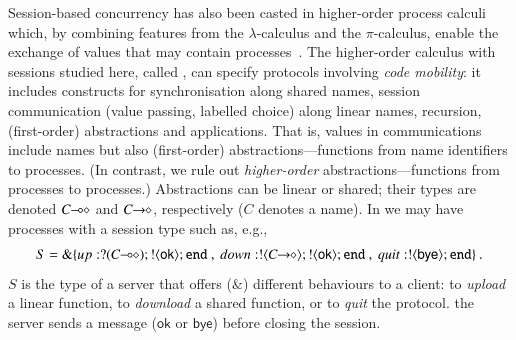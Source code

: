 \documentclass[runningheads]{llncs}
\begin{document}
Session-based concurrency has also been casted in {higher-order} process
calculi which, by combining features from the $\lambda$-calculus and the $\pi$-calculus, 
enable the exchange of values 
that may contain processes~\cite{tlca07,DBLP:journals/jfp/GayV10}. 
The higher-order calculus with sessions studied here, called \HOp,
can specify protocols involving \emph{code mobility}: it includes
constructs for 
synchronisation along shared names, 
session communication (value passing, labelled choice) along linear names,
recursion, 
 (first-order) abstractions 
 and applications.
 That is, 
 values in communications include names but also (first-order) abstractions---functions from name identifiers to processes. 
 (In contrast, we rule out \emph{higher-order} abstractions---functions from processes to processes.)
Abstractions can be linear or shared; their types are  denoted $C\!\! \multimap\!\! \diamond$ and $C\!\! \rightarrow\!\! \diamond$, respectively ($C$ 
denotes a name). In \HOp we may have processes with a 
session type such as, e.g.,
$$S = \btbra{{up}:\btinp{\lhot{C}}\btout{\mathsf{ok}}\tinact ~ , ~ {down}:\btout{\shot{C}}\btout{\mathsf{ok}}\tinact ~ , ~{quit}:\btout{\mathsf{bye}}\tinact}_{}\,.$$
$S$ is the type of 
a server that offers ($\&$)  different behaviours to a client: 
  to \emph{upload} a linear function, %
  to \emph{download} a shared function, %
   or to \emph{quit} the protocol. 
  the server sends a message ($\mathsf{ok}$ or $\mathsf{bye}$) before closing the session.
\end{document}
